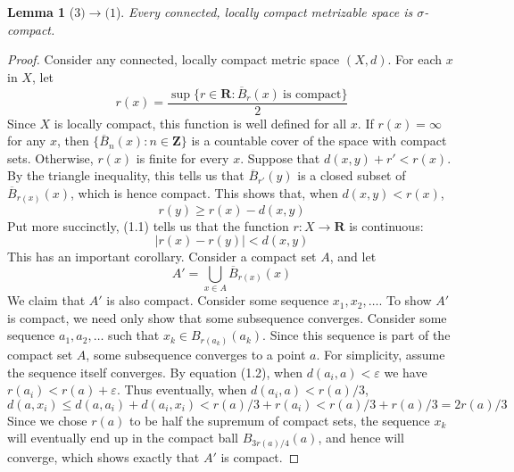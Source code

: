 \documentclass[12pt]{report}
\theoremstyle{plain}
\newtheorem{lemma}[theorem]{Lemma}
\theoremstyle{definition}
\begin{document}
\begin{lemma}[$3) \to (1$]
    Every connected, locally compact metrizable space is $\sigma$-compact.
\end{lemma}
\begin{proof}
    Consider any connected, locally compact metric space $(X,d)$. For each $x$ in $X$, let
    \[ r(x) = \frac{\sup \{ r \in \mathbf{R} : \overline{B}_r(x)\ \text{is compact} \}}{2} \]
    Since $X$ is locally compact, this function is well defined for all $x$. If $r(x) = \infty$ for any $x$, then $\{ \overline{B}_n(x) : n \in \mathbf{Z} \}$ is a countable cover of the space with compact sets. Otherwise, $r(x)$ is finite for every $x$. Suppose that $d(x,y) + r' < r(x)$. By the triangle inequality, this tells us that $\overline{B}_{r'}(y)$ is a closed subset of $\overline{B}_{r(x)}(x)$, which is hence compact. This shows that, when $d(x,y) < r(x)$,
    \begin{equation} r(y) \geq r(x) - d(x,y) \end{equation}
    Put more succinctly, (1.1) tells us that the function $r:X \to \mathbf{R}$ is continuous:
    \begin{equation} |r(x) - r(y)| < d(x,y) \end{equation}
    This has an important corollary. Consider a compact set $A$, and let
    \begin{equation} A' = \bigcup_{x \in A} \overline{B}_{r(x)}(x) \end{equation}
    We claim that $A'$ is also compact. Consider some sequence $x_1, x_2, \dots$. To show $A'$ is compact, we need only show that some subsequence converges. Consider some sequence $a_1, a_2, \dots$ such that $x_k \in B_{r(a_k)}(a_k)$. Since this sequence is part of the compact set $A$, some subsequence converges to a point $a$. For simplicity, assume the sequence itself converges. By equation (1.2), when $d(a_i, a) < \varepsilon$
    we have $r(a_i) < r(a) + \varepsilon$. Thus eventually, when $d(a_i,a) < r(a)/3$,
    \begin{equation} d(a,x_i) \leq d(a,a_i) + d(a_i,x_i) < r(a)/3 + r(a_i) < r(a)/3 + r(a)/3 = 2r(a)/3 \end{equation}
    Since we chose $r(a)$ to be half the supremum of compact sets, the sequence $x_k$ will eventually end up in the compact ball $B_{3r(a)/4}(a)$, and hence will converge, which shows exactly that $A'$ is compact.


\end{proof}
\end{document}

